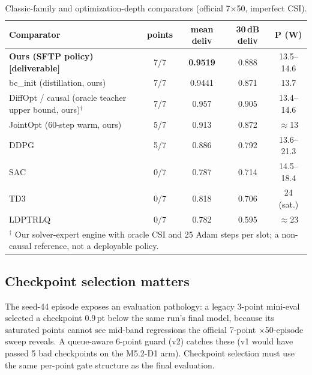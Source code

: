 \documentclass[journal]{IEEEtran}
\begin{document}
\begin{table}[t]
\centering
\small
\caption{Classic-family and optimization-depth comparators (official 7$\times$50, imperfect CSI).}
\label{tab:classic}
\begin{tabular}{l|c|c|c|c}
\toprule
Comparator & points & mean deliv & 30\,dB deliv & P (W) \\
\midrule
\bfseries Ours (SFTP policy) [deliverable] & 7/7 & \textbf{0.9519} & 0.888 & 13.5--14.6 \\
bc\_init (distillation, ours) & 7/7 & 0.9441 & 0.871 & 13.7 \\
DiffOpt / causal (oracle teacher upper bound, ours)$^\dagger$ & 7/7 & 0.957 & 0.905 & 13.4--14.6 \\
JointOpt (60-step warm, ours) & 5/7 & 0.913 & 0.872 & $\approx$13 \\
DDPG~\cite{lillicrap2016ddpg} & 5/7 & 0.886 & 0.792 & 13.6--21.3 \\
SAC~\cite{haarnoja2018sac} & 0/7 & 0.787 & 0.714 & 14.5--18.4 \\
TD3~\cite{fujimoto2018td3} & 0/7 & 0.818 & 0.706 & 24 (sat.) \\
LDPTRLQ~\cite{zhu2025lyapguid} & 0/7 & 0.782 & 0.595 & $\approx$23 \\
\bottomrule
\multicolumn{5}{l}{\footnotesize$^\dagger$ Our solver-expert engine with oracle CSI and 25 Adam steps per slot; a non-causal reference, not a deployable policy.}\\
\end{tabular}
\end{table}

\subsection{Checkpoint selection matters}
The seed-44 episode exposes an evaluation pathology: a legacy 3-point mini-eval
selected a checkpoint 0.9\,pt below the same run's final model, because its
saturated points cannot see mid-band regressions the official 7-point
$\times$50-episode sweep reveals. A queue-aware 6-point guard (v2) catches these
(v1 would have passed 5 bad checkpoints on the M5.2-D1 arm). Checkpoint selection
must use the same per-point gate structure as the final evaluation.
\end{document}

